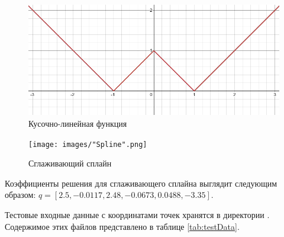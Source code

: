 \begin{figure}
\centering
\vspace*{0.7cm}
\includegraphics[width=0.6\linewidth]{images/PW.png}
\caption{Кусочно-линейная функция}
\label{fig:PW}
\end{figure}

\begin{figure}
\centering
\vspace*{0.7cm}
\texttt{[image: images/"Spline".png]}
\caption{Сглаживающий сплайн}
\label{fig:Spline}
\end{figure}

Коэффициенты решения для сглаживающего сплайна выглядит следующим образом: $q = \left[2.5, -0.0117, 2.48, -0.0673, 0.0488, -3.35\right]$.

Тестовые входные данные с координатами точек хранятся в директории . Содержимое этих файлов представлено в таблице \ref{tab:testData}.

